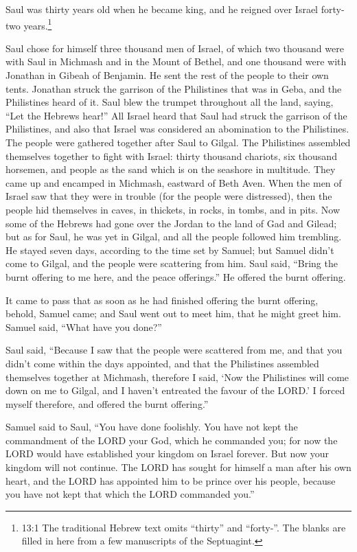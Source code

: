  Saul was thirty years old when he became king, and he
reigned over Israel forty-two years.\footnote{13:1 The traditional
  Hebrew text omits ``thirty'' and ``forty-''. The blanks are filled in
  here from a few manuscripts of the Septuagint.}

 Saul chose for himself three thousand men of Israel, of
which two thousand were with Saul in Michmash and in the Mount of
Bethel, and one thousand were with Jonathan in Gibeah of Benjamin. He
sent the rest of the people to their own tents.  Jonathan
struck the garrison of the Philistines that was in Geba, and the
Philistines heard of it. Saul blew the trumpet throughout all the land,
saying, ``Let the Hebrews hear!''  All Israel heard that
Saul had struck the garrison of the Philistines, and also that Israel
was considered an abomination to the Philistines. The people were
gathered together after Saul to Gilgal.  The Philistines
assembled themselves together to fight with Israel: thirty thousand
chariots, six thousand horsemen, and people as the sand which is on the
seashore in multitude. They came up and encamped in Michmash, eastward
of Beth Aven.  When the men of Israel saw that they were in
trouble (for the people were distressed), then the people hid themselves
in caves, in thickets, in rocks, in tombs, and in pits.  Now
some of the Hebrews had gone over the Jordan to the land of Gad and
Gilead; but as for Saul, he was yet in Gilgal, and all the people
followed him trembling.  He stayed seven days, according to
the time set by Samuel; but Samuel didn't come to Gilgal, and the people
were scattering from him.  Saul said, ``Bring the burnt
offering to me here, and the peace offerings.'' He offered the burnt
offering.

 It came to pass that as soon as he had finished offering
the burnt offering, behold, Samuel came; and Saul went out to meet him,
that he might greet him.  Samuel said, ``What have you
done?''

Saul said, ``Because I saw that the people were scattered from me, and
that you didn't come within the days appointed, and that the Philistines
assembled themselves together at Michmash,  therefore I
said, `Now the Philistines will come down on me to Gilgal, and I haven't
entreated the favour of the LORD.' I forced myself therefore, and
offered the burnt offering.''

 Samuel said to Saul, ``You have done foolishly. You have
not kept the commandment of the LORD your God, which he commanded you;
for now the LORD would have established your kingdom on Israel forever.
 But now your kingdom will not continue. The LORD has
sought for himself a man after his own heart, and the LORD has appointed
him to be prince over his people, because you have not kept that which
the LORD commanded you.''

